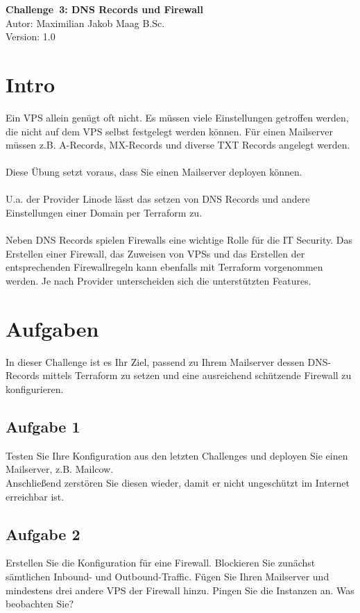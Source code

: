 \documentclass{article}
\begin{document}
    \begin{center}
        \Large \textbf{Challenge 3: DNS Records und Firewall} \\ [6pt]
        \normalsize
        Autor: Maximilian Jakob Maag B.Sc. \\
        Version: 1.0
    \end{center}
    \section{Intro}
        Ein VPS allein genügt oft nicht. Es müssen viele Einstellungen getroffen werden, die nicht auf dem VPS selbst festgelegt werden können.
        Für einen Mailserver müssen z.B. A-Records, MX-Records und diverse TXT Records angelegt werden. \\ \\
        Diese Übung setzt voraus, dass Sie einen Mailserver deployen können. \\ \\
        U.a. der Provider Linode lässt das setzen von DNS Records und andere Einstellungen einer Domain per Terraform zu. \\ \\
        Neben DNS Records spielen Firewalls eine wichtige Rolle für die IT Security. Das Erstellen einer Firewall, das Zuweisen von VPSs und das Erstellen der
        entsprechenden Firewallregeln kann ebenfalls mit Terraform vorgenommen werden. Je nach Provider unterscheiden sich die unterstützten Features.
    \section{Aufgaben}
        In dieser Challenge ist es Ihr Ziel, passend zu Ihrem Mailserver dessen DNS-Records mittels Terraform zu setzen und
        eine ausreichend schützende Firewall zu konfigurieren.
    \subsection{Aufgabe 1}
        Testen Sie Ihre Konfiguration aus den letzten Challenges und deployen Sie einen Mailserver, z.B. Mailcow. \\
        Anschließend zerstören Sie diesen wieder, damit er nicht ungeschützt im Internet erreichbar ist.
    
    \subsection{Aufgabe 2}
        Erstellen Sie die Konfiguration für eine Firewall. Blockieren Sie zunächst sämtlichen Inbound- und Outbound-Traffic.
        Fügen Sie Ihren Mailserver und mindestens drei andere VPS der Firewall hinzu. Pingen Sie die Instanzen an. Was beobachten Sie?
\end{document}
